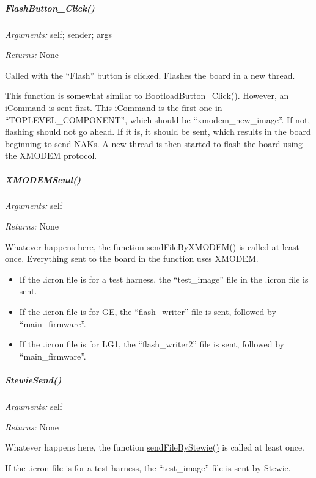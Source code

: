 \documentclass[12pt,letterpaper]{article}
\begin{document}
%
%
\subparagraph{FlashButton\_Click()}
\label{4.3.1.3.13}

\emph{Arguments:} self; sender; args

\emph{Returns:} None

Called with the ``Flash'' button is clicked. Flashes the board in a new thread.

This function is somewhat similar to \hyperref[4.3.1.3.12]{BootloadButton\_Click()}. However, an iCommand is sent first. This iCommand is the first one in ``TOPLEVEL\_COMPONENT'', which should be ``xmodem\_new\_image''. If not, flashing should not go ahead. If it is, it should be sent, which results in the board beginning to send NAKs. A new thread is then started to flash the board using the XMODEM protocol.



%
%
\subparagraph{XMODEMSend()}
\label{4.3.1.3.14}

\emph{Arguments:} self

\emph{Returns:} None

Whatever happens here, the function sendFileByXMODEM() is called at least once. Everything sent to the board in \hyperref[4.9.1.0]{the function} uses XMODEM.

\begin{itemize}

\item If the .icron file is for a test harness, the ``test\_image'' file in the .icron file is sent.

\item If the .icron file is for GE, the ``flash\_writer'' file is sent, followed by ``main\_firmware''.

\item If the .icron file is for LG1, the ``flash\_writer2'' file is sent, followed by ``main\_firmware''.

\end{itemize}



%
%
\subparagraph{StewieSend()}
\label{4.3.1.3.15}

\emph{Arguments:} self

\emph{Returns:} None

Whatever happens here, the function \hyperref[4.8.1.0]{sendFileByStewie()} is called at least once.

If the .icron file is for a test harness, the ``test\_image'' file is sent by Stewie.
\end{document}
